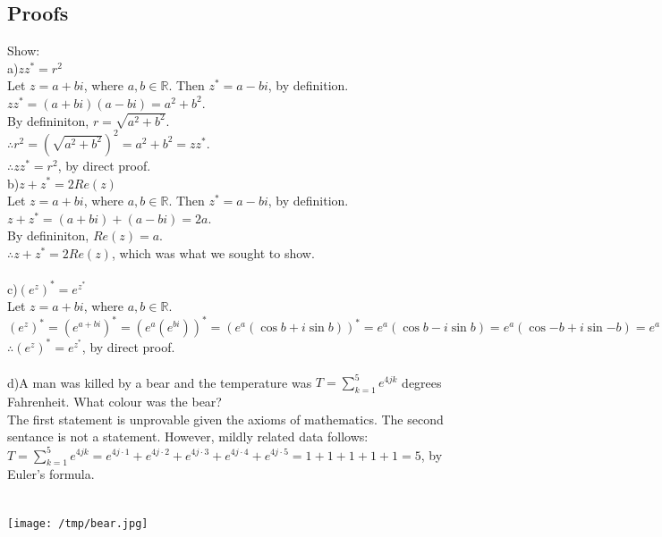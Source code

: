 \documentclass{article}
\begin{document}
\subsection{Proofs}
Show:
\\a)$zz^* = r^2$
\\Let $z = a + bi$, where $a, b \in \mathbb{R}$.
Then $z^* = a - bi$, by definition.
\\$zz^* = (a + bi)(a - bi) = a^2 + b^2$.
\\By defininiton, $r = \sqrt{a^2 + b^2}$.
\\$\therefore r^2 = {(\sqrt{a^2 + b^2})}^2 = a^2 + b^2 = zz^*$.
\\$\therefore zz^* = r^2$, by direct proof.
\newpage
\\b)$z+z^* = 2Re(z)$
\\Let $z = a + bi$, where $a, b \in \mathbb{R}$.
Then $z^* = a - bi$, by definition.
\\$z+z^* = (a + bi) + (a - bi) = 2a$.
\\By defininiton, $Re(z) = a$.
\\$\therefore z+z^* = 2Re(z)$, which was what we sought to show.
\\
\\c)$(e^z)^* = e^{z^*}$
\\Let $z = a + bi$, where $a, b \in \mathbb{R}$.
\\$(e^z)^* = (e^{a + bi})^* = (e^a(e^{bi}))^* = (e^a(\cos b + i\sin b))^* =
e^a(\cos b - i\sin b) = e^a(\cos{-b} + i\sin{-b}) = e^a(e^{-bi}) = e^{a - bi} = e^{z^*}$
\\$\therefore (e^z)^* = e^{z^*}$, by direct proof.
\\
\\d)A man was killed by a bear and the temperature was
$T = \sum_{k=1}^{5}e^{4jk}$ degrees Fahrenheit. What colour was the bear?
\\The first statement is unprovable given the axioms of mathematics.
The second sentance is not a statement.
However, mildly related data follows:
\\$T = \sum_{k=1}^{5}e^{4jk} =
e^{4j \cdot 1} + e^{4j \cdot 2} + e^{4j \cdot 3} + e^{4j \cdot 4} +
e^{4j \cdot 5} = 1 + 1 + 1 + 1 + 1 = 5$, by Euler's formula.
\begin{center}
\\\texttt{[image: /tmp/bear.jpg]}
\end{center}
\\
\end{document}
